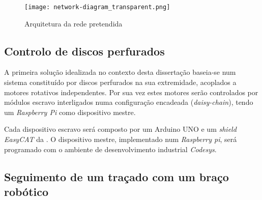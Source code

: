 \begin{figure}
 \centering
 \texttt{[image: network-diagram\_transparent.png]}
 \caption{Arquitetura da rede \ecat pretendida}
 \label{fig:network-architecture}
\end{figure}



\subsection{Controlo de discos perfurados}

A primeira solução idealizada no contexto desta dissertação baseia-se num
sistema constituído por discos perfurados na sua extremidade, acoplados
a motores rotativos independentes. Por sua vez estes motores serão
controlados por módulos \ecat escravo interligados numa configuração
encadeada (\emph{daisy-chain}), tendo um \emph{Raspberry Pi} como dispositivo
mestre.

Cada dispositivo \ecat escravo será composto por um Arduino UNO 
\cite[]{arduino:ArduinoUNORev3} e um \emph{shield EasyCAT} da 
\cite{ABT:EasyCAT}. O dispositivo mestre, implementado num \emph{Raspberry
pi}, será programado com o ambiente de desenvolvimento industrial \emph{
Codesys}.

\subsection{Seguimento de um traçado com um braço robótico}


